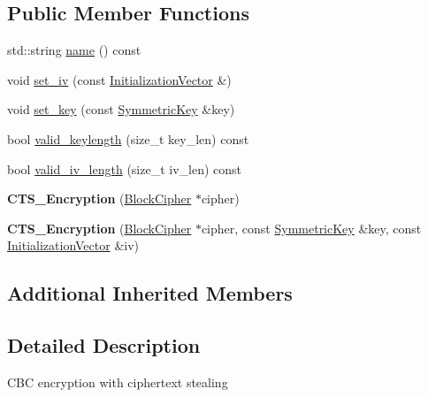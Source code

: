 \subsection*{Public Member Functions}
\begin{DoxyCompactItemize}
\item 
std\-::string \hyperlink{classBotan_1_1CTS__Encryption_a72121f8ed50d196522ee0e5fb6e78a7c}{name} () const 
\item 
void \hyperlink{classBotan_1_1CTS__Encryption_aa2c5361c7d7418b088c8509639b0a221}{set\-\_\-iv} (const \hyperlink{namespaceBotan_ab6a07e859c4e3a2ccfd68308ec89497e}{Initialization\-Vector} \&)
\item 
void \hyperlink{classBotan_1_1CTS__Encryption_ac344741021b741a3055e08f9a8e5f9ab}{set\-\_\-key} (const \hyperlink{namespaceBotan_a00c78597211d5c63b63e2a57ddb96d38}{Symmetric\-Key} \&key)
\item 
bool \hyperlink{classBotan_1_1CTS__Encryption_afce0586d81b2906785473da6c53d86c8}{valid\-\_\-keylength} (size\-\_\-t key\-\_\-len) const 
\item 
bool \hyperlink{classBotan_1_1CTS__Encryption_a62e32a019983b3402463a9e643fbed82}{valid\-\_\-iv\-\_\-length} (size\-\_\-t iv\-\_\-len) const 
\item 
\hypertarget{classBotan_1_1CTS__Encryption_acdb770d540928fdfc860d42fe2a22021}{{\bfseries C\-T\-S\-\_\-\-Encryption} (\hyperlink{classBotan_1_1BlockCipher}{Block\-Cipher} $\ast$cipher)}\label{classBotan_1_1CTS__Encryption_acdb770d540928fdfc860d42fe2a22021}

\item 
\hypertarget{classBotan_1_1CTS__Encryption_a810cc450314cbd9bdd90cb5274cbce10}{{\bfseries C\-T\-S\-\_\-\-Encryption} (\hyperlink{classBotan_1_1BlockCipher}{Block\-Cipher} $\ast$cipher, const \hyperlink{namespaceBotan_a00c78597211d5c63b63e2a57ddb96d38}{Symmetric\-Key} \&key, const \hyperlink{namespaceBotan_ab6a07e859c4e3a2ccfd68308ec89497e}{Initialization\-Vector} \&iv)}\label{classBotan_1_1CTS__Encryption_a810cc450314cbd9bdd90cb5274cbce10}

\end{DoxyCompactItemize}
\subsection*{Additional Inherited Members}


\subsection{Detailed Description}
C\-B\-C encryption with ciphertext stealing 

